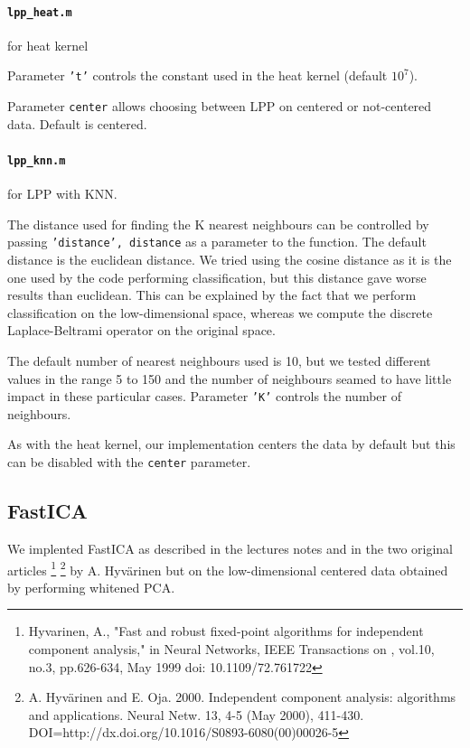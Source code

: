 \documentclass[10pt, a4paper]{article}
\begin{document}
\paragraph{\texttt{lpp\_heat.m}} for heat kernel

Parameter \texttt{'t'} controls the constant used in the heat kernel (default $10^7$).

Parameter \texttt{center} allows choosing between LPP on centered or not-centered data. Default is centered.

\paragraph{\texttt{lpp\_knn.m}} for LPP with KNN.

The distance used for finding the K nearest neighbours can be controlled by passing \texttt{'distance', distance} as a parameter to the function. The default distance is the euclidean distance. We tried using the cosine distance as it is the one used by the code performing classification, but this distance gave worse results than euclidean. This can be explained by the fact that we perform classification on the low-dimensional space, whereas we compute the discrete Laplace-Beltrami operator on the original space.

The default number of nearest neighbours used is 10, but we tested different values in the range 5 to 150 and the number of neighbours seamed to have little impact in these particular cases. Parameter \texttt{'K'} controls the number of neighbours.

As with the heat kernel, our implementation centers the data by default but this can be disabled with the \texttt{center} parameter.

\subsection{FastICA}

We implented FastICA as described in the lectures notes and in the two original articles \footnote{Hyvarinen, A., "Fast and robust fixed-point algorithms for independent component analysis," in Neural Networks, IEEE Transactions on , vol.10, no.3, pp.626-634, May 1999
doi: 10.1109/72.761722} \footnote{A. Hyvärinen and E. Oja. 2000. Independent component analysis: algorithms and applications. Neural Netw. 13, 4-5 (May 2000), 411-430. DOI=http://dx.doi.org/10.1016/S0893-6080(00)00026-5 } by A. Hyvärinen but on the low-dimensional centered data obtained by performing whitened PCA.
\end{document}
